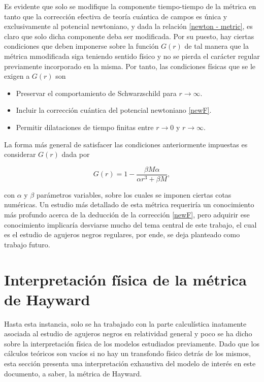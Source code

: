 \documentclass{article}
\numberwithin{equation}{section}
\theoremstyle{definition}
\begin{document}
Es evidente que solo se modifique la componente tiempo-tiempo de la métrica en tanto que la corrección efectiva de teoría cuántica de campos es única y exclusivamente al  potencial newtoniano, y dada la relación \eqref{newton - metric}, es claro que solo dicha componente deba ser modificada. Por su puesto, hay ciertas condiciones que deben imponerse sobre la función $G(r)$ de tal manera que la métrica mmodificada siga teniendo sentido físico y no se pierda el carácter regular previamente incorporado en la misma. Por tanto, las condiciones físicas que se le exigen a $G(r)$ son
\begin{itemize}
\item Preservar el comportamiento de Schwarzschild para $r \to \infty$.
\item Incluir la corrección cuántica del potencial newtoniano \eqref{newF}.
\item Permitir dilataciones de tiempo finitas entre $r \to 0$ y $r \to \infty$.
\end{itemize}

La forma más general de satisfacer las condiciones anteriormente impuestas es considerar $G(r)$ dada por

\begin{equation}
\label{mod-hay-g}
G(r) = 1 - \frac{\beta M \alpha}{\alpha r^3 + \beta M},
\end{equation}

con $\alpha$ y $\beta$ parámetros variables, sobre los cuales se imponen ciertas cotas numéricas. Un estudio más detallado de esta métrica requeriría un conocimiento más profundo acerca de la deducción de la corrección \eqref{newF}, pero adquirir ese conocimiento implicaría desviarse mucho del tema central de este trabajo, el cual es el estudio de agujeros negros regulares, por ende, se deja planteado como trabajo futuro.

\section{Interpretación física de la métrica de Hayward}

Hasta esta instancia, solo se ha trabajado con la parte calculística inatamente asociada al estudio de agujeros negros en relatividad general y poco se ha dicho sobre la interpretación física de los modelos estudiados previamente. Dado que los cálculos teóricos son vacíos si no hay un transfondo físico detrás de los mismos, esta sección presenta una interpretación exhaustiva del modelo de interés en este documento, a saber, la métrica de Hayward.\\
\end{document}
